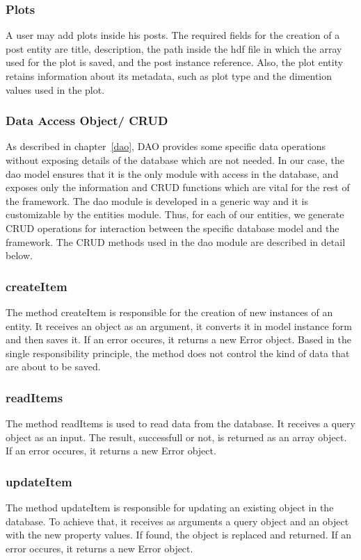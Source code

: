\subsubsection{Plots}
A user may add plots inside his posts. The required fields for the creation of a post entity are title, description, the path inside the hdf file in which the array used for the plot is saved, and the post instance reference. Also, the plot entity retains information about its metadata, such as plot type and the dimention values used in the plot.

\subsubsection{Data Access Object/ CRUD}
\label{daocrud}
As described in chapter~\ref{dao}, DAO provides some specific data operations without exposing details of the database which are not needed. In our case, the dao model ensures that it is the only module with access in the database, and exposes only the information and CRUD functions which are vital for the rest of the framework. The dao module is developed in a generic way and it is customizable by the entities module. Thus, for each of our entities, we generate CRUD operations for interaction between the specific database model and the framework. The CRUD methods used in the dao module are described in detail below.

\subsubsection{createItem}
The method createItem is responsible for the creation of new instances of an entity. It receives an object as an argument, it converts it in model instance form and then saves it. If an error occures, it returns a new Error object. Based in the single responsibility principle, the method does not control the kind of data that are about to be saved.
\subsubsection{readItems}
The method readItems is used to read data from the database. It receives a query object as an input. The result, successfull or not, is returned as an array object. If an error occures, it returns a new Error object.
\subsubsection{updateItem}
The method updateItem is responsible for updating an existing object in the database. To achieve that, it receives as arguments a query object and an object with the new property values. If found, the object is replaced and returned. If an error occures, it returns a new Error object.
